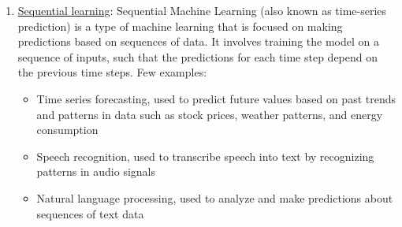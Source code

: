 \documentclass[letterpaper,11pt]{article}
\begin{document}
\begin{enumerate}
    \item \underline{Sequential learning}: Sequential Machine Learning (also known as time-series prediction) is a type of machine learning that is focused on making predictions based on sequences of data. It involves training the model on a sequence of inputs, such that the predictions for each time step depend on the previous time steps. Few examples:
    \begin{itemize}
        \item Time series forecasting, used to predict future values based on past trends and patterns in data such as stock prices, weather patterns, and energy consumption
        \item Speech recognition, used to transcribe speech into text by recognizing patterns in audio signals
        \item Natural language processing, used to analyze and make predictions about sequences of text data        
    \end{itemize}
\end{enumerate}
\end{document}
